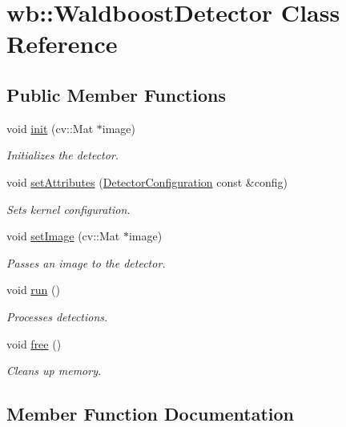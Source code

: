 \hypertarget{classwb_1_1_waldboost_detector}{}\section{wb\+:\+:Waldboost\+Detector Class Reference}
\label{classwb_1_1_waldboost_detector}
\subsection*{Public Member Functions}
\begin{DoxyCompactItemize}
\item 
void \hyperlink{classwb_1_1_waldboost_detector_ab6cc8c1421a2b6fd514c8cb42f1f0ed4}{init} (cv\+::\+Mat $\ast$image)
\begin{DoxyCompactList}\small\item\em Initializes the detector. \end{DoxyCompactList}\item 
void \hyperlink{classwb_1_1_waldboost_detector_acf8bb18f7cacd078f898516aa6b5f91b}{set\+Attributes} (\hyperlink{structwb_1_1_detector_configuration}{Detector\+Configuration} const \&config)
\begin{DoxyCompactList}\small\item\em Sets kernel configuration. \end{DoxyCompactList}\item 
void \hyperlink{classwb_1_1_waldboost_detector_a56111c56b061abd651d51a8f886482f2}{set\+Image} (cv\+::\+Mat $\ast$image)
\begin{DoxyCompactList}\small\item\em Passes an image to the detector. \end{DoxyCompactList}\item 
void \hyperlink{classwb_1_1_waldboost_detector_adcd37445b984e3e48182d45eec76bb66}{run} ()
\begin{DoxyCompactList}\small\item\em Processes detections. \end{DoxyCompactList}\item 
void \hyperlink{classwb_1_1_waldboost_detector_a6e723e3d0e56b74aaa607c3fd7cc6064}{free} ()
\begin{DoxyCompactList}\small\item\em Cleans up memory. \end{DoxyCompactList}\end{DoxyCompactItemize}


\subsection{Member Function Documentation}
\hypertarget{classwb_1_1_waldboost_detector_a6e723e3d0e56b74aaa607c3fd7cc6064}{}
